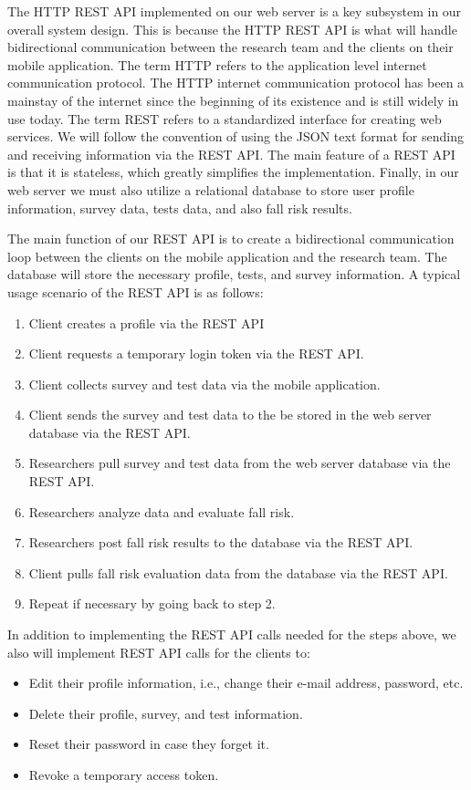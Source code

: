\documentclass[conference]{IEEEtran}
\begin{document}
The HTTP REST API implemented on our web server is a key subsystem in our overall system design. This is because the HTTP REST API is what will handle bidirectional communication between the research team and the clients on their mobile application. The term HTTP refers to the application level internet communication protocol. The HTTP internet communication protocol has been a mainstay of the internet since the beginning of its existence and is still widely in use today. The term REST refers to a standardized interface for creating web services. We will follow the convention of using the JSON text format for sending and receiving information via the REST API. The main feature of a REST API is that it is stateless, which greatly simplifies the implementation. Finally, in our web server we must also utilize a relational database to store user profile information, survey data, tests data, and also fall risk results.

The main function of our REST API is to create a bidirectional communication loop between the clients on the mobile application and the research team. The database will store the necessary profile, tests, and survey information. A typical usage scenario of the REST API is as follows:
\begin{enumerate}
    \item Client creates a profile via the REST API
    \item Client requests a temporary login token via the REST API.
    \item Client collects survey and test data via the mobile application.
    \item Client sends the survey and test data to the be stored in the web server database via the REST API.
    \item Researchers pull survey and test data from the web server database via the REST API.
    \item Researchers analyze data and evaluate fall risk.
    \item Researchers post fall risk results to the database via the REST API.
    \item Client pulls fall risk evaluation data from the database via the REST API.
    \item Repeat if necessary by going back to step 2.
\end{enumerate}
In addition to implementing the REST API calls needed for the steps above, we also will implement REST API calls for the clients to:
\begin{itemize}
    \item Edit their profile information, i.e., change their e-mail address, password, etc.
    \item Delete their profile, survey, and test information.
    \item Reset their password in case they forget it.
    \item Revoke a temporary access token.
\end{itemize}
\end{document}
